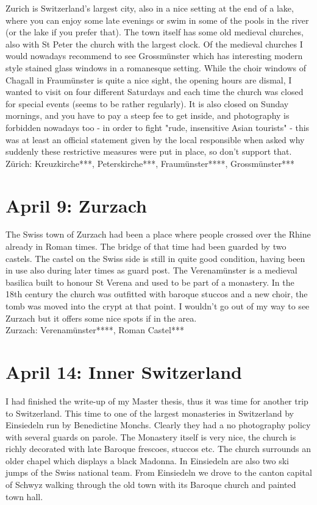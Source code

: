 Zurich is Switzerland's largest city, also in a nice setting at the end of a lake, where you can enjoy some late evenings or swim in some of the pools in the river (or the lake if you prefer that). The town itself has some old medieval churches, also with St Peter the church with the largest clock. Of the medieval churches I would nowadays recommend to see Grossm\"unster which has interesting modern style stained glass windows in a romanesque setting. While the choir windows of Chagall in Fraum\"unster is quite a nice sight, the opening hours are dismal, I wanted to visit on four different Saturdays and each time the church was closed for special events (seems to be rather regularly). It is also closed on Sunday mornings, and you have to pay a steep fee to get inside, and photography is forbidden nowadays too - in order to fight "rude, insensitive Asian tourists" - this was at least an official statement given by the local responsible when asked why suddenly these restrictive measures were put in place, so don't support that.\\

Z\"urich: Kreuzkirche***, Peterskirche***, Fraum\"unster****, Grossm\"unster***

\section{April 9: Zurzach}
\label{2007:Zurzach}

The Swiss town of Zurzach had been a place where people crossed over the Rhine already in Roman times. The bridge of that time had been guarded by two castels. The castel on the Swiss side is still in quite good condition, having been in use also during later times as guard post. The Verenam\"unster is a medieval basilica built to honour St Verena and used to be part of a monastery. In the 18th century the church was outfitted with baroque stuccos and a new choir, the tomb was moved into the crypt at that point. I wouldn't go out of my way to see Zurzach but it offers some nice spots if in the area.\\

Zurzach: Verenam\"unster****, Roman Castel***

\section{April 14: Inner Switzerland}
\label{2007:Switzerland}

I had finished the write-up of my Master thesis, thus it was time for another trip to Switzerland. This time to one of the largest monasteries in Switzerland by Einsiedeln run by Benedictine Monchs. Clearly they had a no photography policy with several guards on parole. The Monastery itself is very nice, the church is richly decorated with late Baroque frescoes, stuccos etc. The church surrounds an older chapel which displays a black Madonna. In Einsiedeln are also two ski jumps of the Swiss national team. From Einsiedeln we drove to the canton capital of Schwyz walking through the old town with its Baroque church and painted town hall.\\

